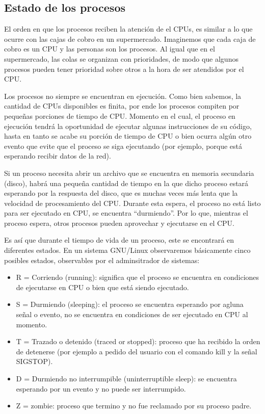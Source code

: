 \documentclass[12pt]{article}
\begin{document}
\subsection*{Estado de los procesos}

El orden en que los procesos reciben la atención de el CPUs, es 
similar a lo que ocurre con las cajas de cobro en un supermercado. 
Imaginemos que cada caja de cobro es un CPU y las personas son los 
procesos. Al igual que en el supermercado, las colas se organizan con 
prioridades, de modo que algunos procesos pueden tener prioridad 
sobre otros a la hora de ser atendidos por el CPU. 

Los procesos no siempre se encuentran en ejecución. 
Como bien sabemos, la cantidad de CPUs disponibles es finita, por ende 
los procesos compiten por 
pequeñas porciones de tiempo de CPU. Momento en el cual, el proceso en 
ejecución tendrá la oportunidad de ejecutar algunas instrucciones de su 
código, hasta en tanto se acabe su porción de tiempo de CPU o bien ocurra 
algún otro evento que evite que el proceso se siga ejecutando (por ejemplo, 
porque está esperando recibir datos de la red). 

Si un proceso necesita abrir un archivo que se encuentra en 
memoria secundaria (disco), habrá una pequeña cantidad de tiempo en la que 
dicho proceso estará esperando por la respuesta del disco, que es muchas 
veces más lenta que la velocidad de procesamiento del CPU. Durante esta
espera, el proceso no está listo para ser ejecutado en CPU, se encuentra 
``durmiendo''. Por lo que, mientras el proceso espera, otros procesos 
pueden aprovechar y ejecutarse en el CPU. 
  
Es así que durante el tiempo de vida de un proceso, este se encontrará en 
diferentes estados. En un sistema GNU/Linux observaremos básicamente 
cinco posibles estados, observables por el adminsitrador de sistemas: 

\begin{itemize}
\item R = Corriendo (running): significa que el proceso se encuentra en 
condiciones de ejecutarse en CPU o bien que está siendo ejecutado.  
\item S = Durmiendo (sleeping): el proceso se encuentra esperando por 
agluna señal o evento, no se encuentra en condiciones de ser ejecutado en 
CPU al momento. 
\item T = Trazado o detenido (traced or stopped): proceso que ha recibido 
la orden de detenerse (por ejemplo a pedido del usuario con el comando 
kill y la señal SIGSTOP). 
\item D = Durmiendo no interrumpible (uninterruptible sleep): se encuentra
esperando por un evento y no puede ser interrumpido. 
\item Z = zombie: proceso que termino y no fue reclamado por su proceso 
padre. 
\end{itemize}
\end{document}
